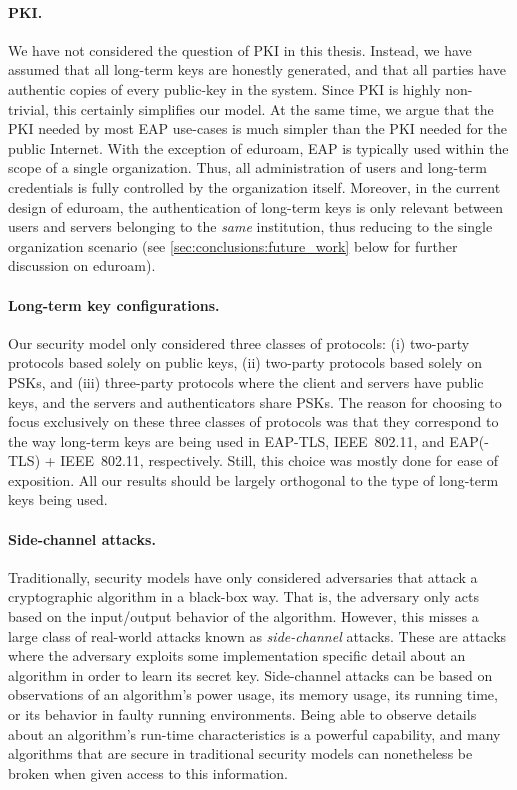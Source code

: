 \paragraph{PKI.}
We have not considered the question of PKI in this thesis.
Instead,
we have assumed that all long-term keys are honestly generated,
and that all parties have authentic copies of every public-key in the system.
Since PKI is highly non-trivial,
this certainly simplifies our model.
At the same time,
we argue that the PKI needed by most EAP use-cases is much simpler than the PKI needed for the public Internet.
With the exception of eduroam,
EAP is typically used within the scope of a single organization.
Thus,
all administration of users and long-term credentials is fully controlled by the organization itself.
Moreover,
in the current design of eduroam,
the authentication of long-term keys is only relevant between users and servers belonging to the \emph{same} institution,
thus reducing to the single organization scenario
(see \cref{sec:conclusions:future_work} below for further discussion on eduroam).




\paragraph{Long-term key configurations.}
Our security model only considered three classes of protocols:
(i) two-party protocols based solely on public keys,
(ii) two-party protocols based solely on PSKs,
and (iii) three-party protocols where the client and servers have public keys,
and the servers and authenticators share PSKs.
The reason for choosing to focus exclusively on these three classes of protocols was that they correspond to the way long-term keys are being used in
EAP-TLS, IEEE~802.11, and EAP(-TLS) + IEEE~802.11,
respectively.
Still,
this choice was mostly done for ease of exposition.
All our  results should be largely orthogonal to the type of long-term keys being used.

 


\paragraph{Side-channel attacks.}
Traditionally,
security models have only considered adversaries that attack a cryptographic algorithm in a black-box way.
That is,
the adversary only acts based on the input/output behavior of the algorithm. 
However,
this misses a large class of real-world attacks known as \emph{side-channel} attacks.
These are attacks where the adversary exploits some implementation specific detail about an algorithm in order to learn its secret key.
Side-channel attacks can be based on observations of an algorithm's power usage,
its memory usage,
its running time,
or its behavior in faulty running environments. 
Being able to observe details about an algorithm's run-time characteristics is a  powerful capability,
and many algorithms that are secure in traditional security models can nonetheless be broken when given access to this information.

